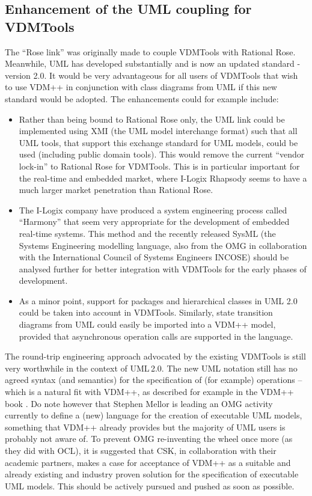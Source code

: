 \subsection{Enhancement of the UML coupling for VDMTools}

The ``Rose link'' was originally made to couple VDMTools with Rational Rose.
Meanwhile, UML has developed substantially and is now an updated standard -
version 2.0. It would be very advantageous for all users of VDMTools that
wish to use VDM++ in conjunction with class diagrams from UML if this new
standard would be adopted. The enhancements could for example include:

\begin{itemize}
\item Rather than being bound to Rational Rose only, the UML link could be
implemented using XMI (the UML model interchange format) such that all UML
tools, that support this exchange standard for UML models, could be used
(including public domain tools). This would remove the current ``vendor
lock-in'' to Rational Rose for VDMTools. This is in particular important
for the real-time and embedded market, where I-Logix Rhapsody seems to
have a much larger market penetration than Rational Rose. 

\item The I-Logix company have produced a system engineering process called
``Harmony'' that seem very appropriate for the development of embedded
real-time systems. This method and the recently released SysML (the Systems
Engineering modelling language, also from the OMG in collaboration with the
International Council of Systems Engineers INCOSE) should be analysed further
for better integration with VDMTools for the early phases of development. 

\item As a minor point, support for packages and hierarchical classes
in UML 2.0 could be taken into account in VDMTools. Similarly, state
transition diagrams from UML could easily be imported into a VDM++ model,
provided that asynchronous operation calls are supported in the language.
\end{itemize}

The round-trip engineering approach advocated by the existing VDMTools
is still very worthwhile in the context of UML\,2.0. The new UML notation
still has no agreed syntax (and semantics) for the specification of
(for example) operations -- which is a natural fit with VDM++, as
described for example in the VDM++ book \cite{vdmbook}. Do note however
that Stephen Mellor is leading an OMG activity currently to define a (new)
language for the creation of executable UML models, something that VDM++
already provides but the majority of UML users is probably not aware of.
To prevent OMG re-inventing the wheel once more (as they did with OCL),
it is suggested that CSK, in collaboration with their academic partners,
makes a case for acceptance of VDM++ as a suitable and already existing
and industry proven solution for the specification of executable UML
models. This should be actively pursued and pushed as soon as possible. \\

